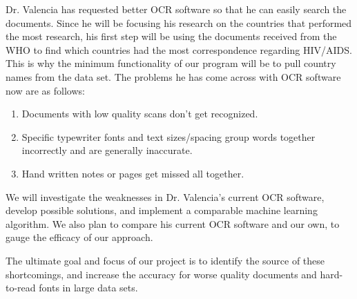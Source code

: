 \documentclass{article}
\begin{document}
Dr. Valencia has requested better OCR software so that he can easily search the documents.
Since he will be focusing his research on the countries that performed the most research, his first step will be using the documents received from the WHO to find which countries had the most correspondence regarding HIV/AIDS.
This is why the minimum functionality of our program will be to pull country names from the data set.
%
The problems he has come across with OCR software now are as follows:
\begin{enumerate}
  \item Documents with low quality scans don't get recognized.
  \item Specific typewriter fonts and text sizes/spacing group words together incorrectly and are generally inaccurate.
  \item Hand written notes or pages get missed all together.
\end{enumerate}

We will investigate the weaknesses in Dr. Valencia's current OCR software, develop possible solutions, and implement a comparable machine learning algorithm.
We also plan to compare his current OCR software and our own, to gauge the efficacy of our approach.

The ultimate goal and focus of our project is to identify the source of these shortcomings, and increase the accuracy for worse quality documents and hard-to-read fonts in large data sets.
\end{document}
